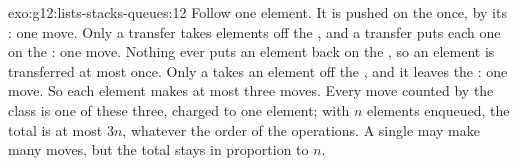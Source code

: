 \begin{solution}{exo:g12:lists-stacks-queues:12}
Follow one element. It is pushed on the  once, by its : one move. Only a transfer takes elements off
the , and a transfer puts each one on the : one move. Nothing ever puts an element back on the
, so an element is transferred at most once. Only a  takes an element off the , and it
leaves the : one move. So each element makes at most three moves. Every move counted by the class is one of
these three, charged to one element; with $n$ elements enqueued, the total is at most $3n$, whatever the order of
the operations. A single  may make many moves, but the total stays in proportion to $n$.
\end{solution}

